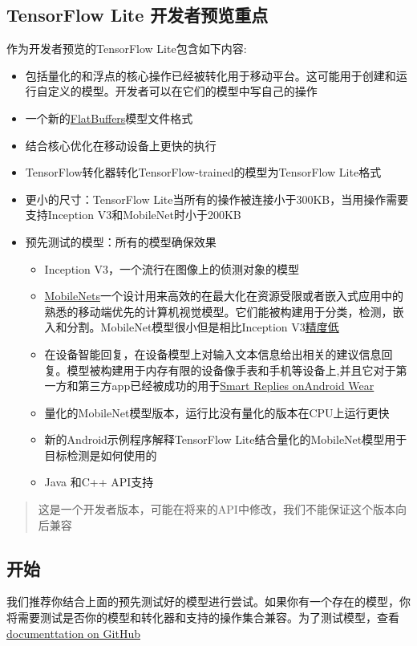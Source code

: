 \subsection{TensorFlow Lite 开发者预览重点}
作为开发者预览的TensorFlow Lite包含如下内容:
\begin{itemize}
\item 包括量化的和浮点的核心操作已经被转化用于移动平台。这可能用于创建和运行自定义的模型。开发者可以在它们的模型中写自己的操作
\item 一个新的\href{https://google.github.io/flatbuffers/}{FlatBuffers}模型文件格式
\item 结合核心优化在移动设备上更快的执行
\item TensorFlow转化器转化TensorFlow-trained的模型为TensorFlow Lite格式
\item 更小的尺寸：TensorFlow Lite当所有的操作被连接小于300KB，当用操作需要支持Inception V3和MobileNet时小于200KB
\item 预先测试的模型：所有的模型确保效果\begin{itemize}
\item Inception V3，一个流行在图像上的侦测对象的模型
\item \href{https://github.com/tensorflow/models/blob/master/research/slim/nets/mobilenet_v1.md}{MobileNets}一个设计用来高效的在最大化在资源受限或者嵌入式应用中的熟悉的移动端优先的计算机视觉模型。它们能被构建用于分类，检测，嵌入和分割。MobileNet模型很小但是相比Inception V3\href{https://research.googleblog.com/2017/06/mobilenets-open-source-models-for.html}{精度低}
\item 在设备智能回复，在设备模型上对输入文本信息给出相关的建议信息回复。模型被构建用于内存有限的设备像手表和手机等设备上,并且它对于第一方和第三方app已经被成功的用于\href{https://research.googleblog.com/2017/02/on-device-machine-intelligence.html}{Smart Replies onAndroid Wear}
\item 量化的MobileNet模型版本，运行比没有量化的版本在CPU上运行更快
\item 新的Android示例程序解释TensorFlow Lite结合量化的MobileNet模型用于目标检测是如何使用的
\item Java 和C++ API支持
\end{itemize}
\end{itemize}
\begin{quote}
这是一个开发者版本，可能在将来的API中修改，我们不能保证这个版本向后兼容
\end{quote}
\subsection{开始}
我们推荐你结合上面的预先测试好的模型进行尝试。如果你有一个存在的模型，你将需要测试是否你的模型和转化器和支持的操作集合兼容。为了测试模型，查看\href{https://github.com/tensorflow/tensorflow/tree/master/tensorflow/contrib/lite}{documenttation on GitHub}
